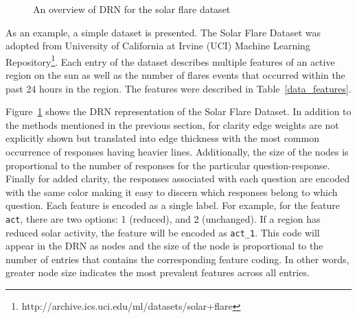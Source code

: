 \begin{figure}[]
    \noindent
    \caption{An overview of DRN for the solar flare dataset \label{solar}}
\end{figure}

As an example, a simple dataset is presented. The Solar Flare Dataset was adopted from University of California at Irvine (UCI) Machine Learning Repository\footnote{http://archive.ics.uci.edu/ml/datasets/solar+flare}. Each entry of the dataset describes multiple features of an active region on the sun as well as the number of flares events that occurred within the past 24 hours in the region. The features were described in Table~\ref{data_features}. 

Figure~\ref{solar} shows the DRN representation of the Solar Flare Dataset. In addition to the methods mentioned in the previous section, for clarity edge weights are not explicitly shown but translated into edge thickness with the most common occurrence of responses having heavier lines. Additionally, the size of the nodes is proportional to the number of responses for the particular question-response. Finally for added clarity, the responses associated with each question are encoded with the same color making it easy to discern which responses belong to which question. Each feature is encoded as a single label. For example, for the feature \texttt{act}, there are two options: 1 (reduced), and 2 (unchanged). If a region has reduced solar activity, the feature will be encoded as \texttt{act\_1}. This code will appear in the DRN as nodes and the size of the node is proportional to the number of entries that contains the corresponding feature coding. In other words, greater node size indicates the most prevalent features across all entries. 

